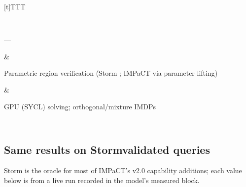\documentclass[a4paper,10pt,english]{sphinxmanual}
\begin{document}
\begin{savenotes}
\begin{tabulary}{\linewidth}[t]{TTT}
\begin{varwidth}[t]{}
\sphinxbeforeendvarwidth
\end{varwidth}%
\\
\sphinxhline\begin{varwidth}[t]{}
\sphinxAtStartPar
—
\sphinxbeforeendvarwidth
\end{varwidth}%
&\begin{varwidth}[t]{}
\sphinxAtStartPar
Parametric region verification (Storm ; IMPaCT via parameter lifting)
\sphinxbeforeendvarwidth
\end{varwidth}%
&\begin{varwidth}[t]{}
\sphinxAtStartPar
GPU (SYCL) solving; orthogonal/mixture IMDPs
\sphinxbeforeendvarwidth
\end{varwidth}%
\\
\sphinxbottomrule
\end{tabulary}
\sphinxtableafterendhook\par
\sphinxattableend\end{savenotes}


\subsection{Same results on Storm\sphinxhyphen{}validated queries}
\label{\detokenize{comparison/impact-vs-storm:same-results-on-storm-validated-queries}}
\sphinxAtStartPar
Storm is the oracle for most of IMPaCT’s v2.0 capability additions; each value below is
from a live run recorded in the model’s  measured block.
\end{document}
